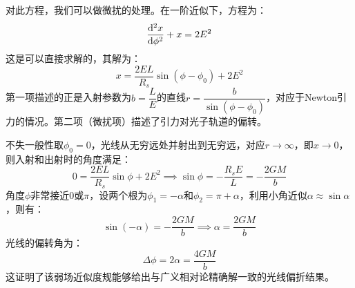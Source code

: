 \documentclass[a4paper]{article}
\begin{document}
\begin{enumerate}
    对此方程，我们可以做微扰的处理。在一阶近似下，方程为：
    \[
        \dv[2]{x}{\phi} + x = 2E^2
    \]
    这是可以直接求解的，其解为：
    \[
        x = \frac{2EL}{R_s} \sin(\phi - \phi_0) + 2E^2
    \]
    第一项描述的正是入射参数为$b = \dfrac{L}{E}$的直线$r = \dfrac{b}{\sin(\phi - \phi_0)}$，对应于Newton引力的情况。第二项（微扰项）描述了引力对光子轨道的偏转。

    不失一般性取$\phi_0 = 0$，光线从无穷远处并射出到无穷远，对应$r \to \infty$，即$x \to 0$，则入射和出射时的角度满足：
    \[
        0 = \frac{2EL}{R_s} \sin\phi + 2E^2 \implies \sin\phi = -\frac{R_s E}{L} = -\frac{2GM}{b}
    \]
    角度$\phi$非常接近$0$或$\pi$，设两个根为$\phi_1 = -\alpha$和$\phi_2 = \pi + \alpha$，利用小角近似$\alpha \approx \sin\alpha$，则有：
    \[
        \sin(-\alpha) = -\frac{2GM}{b} \implies \alpha = \frac{2GM}{b}
    \]
    光线的偏转角为：
    \[
        \Delta \phi = 2\alpha = \frac{4GM}{b}
    \]
    这证明了该弱场近似度规能够给出与广义相对论精确解一致的光线偏折结果。


\end{enumerate}
\end{document}
